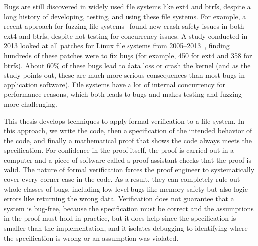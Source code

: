 Bugs are still discovered in widely used file systems like ext4 and btrfs,
despite a long history of developing, testing, and using these file systems. For
example, a
recent approach for fuzzing file systems~\cite{kim:hydra} found new crash-safety
issues in both ext4 and btrfs, despite not testing for concurrency issues. A
study conducted in 2013 looked at all patches for Linux file systems from
2005--2013~\cite{lu:fsstudy}, finding hundreds of these patches were to fix bugs
(for example, 450 for ext4 and 358 for btrfs). About 60\% of these bugs lead to
data loss or crash the kernel (and as the study points out, these are much more
serious consequences than most bugs in application software). File systems have
a lot of internal concurrency for performance reasons, which both leads to bugs
and makes testing and fuzzing more challenging.

This thesis develops techniques to apply formal verification to a file system. In this approach, we write the code, then a specification of the
intended behavior of the code, and finally a mathematical proof that shows the
code always meets the specification. For confidence in the proof itself, the
proof is carried out in a computer and a piece of software called a proof
assistant checks that the proof is valid. The nature of formal verification
forces the proof engineer to systematically cover every corner case in the code.
As a result, they can completely rule out whole classes of bugs, including
low-level bugs like memory safety but also logic errors like returning the wrong
data. Verification does not guarantee that a system is bug-free, because the
specification must be correct and the assumptions in the proof must hold in
practice, but it does help since the specification is smaller than the
implementation, and it isolates debugging to identifying where the specification
is wrong or an assumption was violated.


